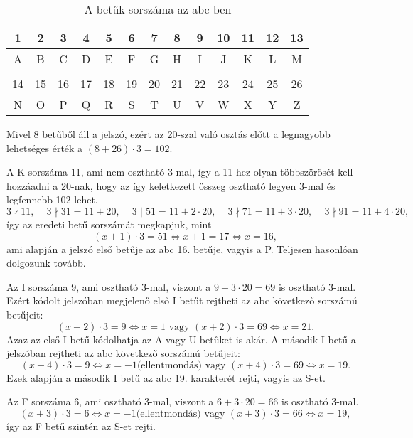 \begin{solution}
\begin{table}[ht]
\centering %
\begin{tabular}{c|c|c|c|c|c|c|c|c|c|c|c|c}
1 & 2 & 3 & 4 & 5 & 6 & 7 & 8 & 9 & 10 & 11 & 12 & 13\tabularnewline
\hline 
A & B & C & D & E & F & G & H & I & J & K & L & M\tabularnewline
\multicolumn{1}{c}{} & \multicolumn{1}{c}{} & \multicolumn{1}{c}{} & \multicolumn{1}{c}{} & \multicolumn{1}{c}{} & \multicolumn{1}{c}{} & \multicolumn{1}{c}{} & \multicolumn{1}{c}{} & \multicolumn{1}{c}{} & \multicolumn{1}{c}{} & \multicolumn{1}{c}{} & \multicolumn{1}{c}{} & \tabularnewline
14 & 15 & 16 & 17 & 18 & 19 & 20 & 21 & 22 & 23 & 24 & 25 & 26\tabularnewline
\hline 
N & O & P & Q & R & S & T & U & V & W & X & Y & Z\tabularnewline
\end{tabular}\caption{A betűk sorszáma az abc-ben}
\end{table}

Mivel 8 betűből áll a jelszó, ezért az 20-szal való osztás előtt a
legnagyobb lehetséges érték a $(8+26)\cdot3=102$.

A K sorszáma 11, ami nem osztható 3-mal, így a 11-hez olyan többszörösét
kell hozzáadni a 20-nak, hogy az így keletkezett összeg osztható legyen
3-mal és legfennebb 102 lehet. 
\[
3\nmid11,\phantom{xx}3\nmid31=11+20,\phantom{xx}3\phantom{l}|\phantom{l}51=11+2\cdot20,\phantom{xx}3\nmid71=11+3\cdot20,\phantom{xx}3\nmid91=11+4\cdot20,
\]
így az eredeti betű sorszámát megkapjuk, mint 
\[
(x+1)\cdot3=51\Leftrightarrow x+1=17\Leftrightarrow x=16,
\]
ami alapján a jelszó első betűje az abc 16. betűje, vagyis a P. Teljesen
hasonlóan dolgozunk tovább.

Az I sorszáma 9, ami osztható 3-mal, viszont a $9+3\cdot20=69$ is
osztható 3-mal. Ezért kódolt jelszóban megjelenő első I betűt rejtheti
az abc következő sorszámú betűjeit: 
\[
(x+2)\cdot3=9\Leftrightarrow x=1\text{ vagy }(x+2)\cdot3=69\Leftrightarrow x=21.
\]
Azaz az első I betű kódolhatja az A vagy U betűket is akár. A második
I betű a jelszóban rejtheti az abc következő sorszámú betűjeit: 
\[
(x+4)\cdot3=9\Leftrightarrow x=-1\text{(ellentmondás)}\text{ vagy }(x+4)\cdot3=69\Leftrightarrow x=19.
\]
Ezek alapján a második I betű az abc 19. karakterét rejti, vagyis
az S-et.

Az F sorszáma 6, ami osztható 3-mal, viszont a $6+3\cdot20=66$ is
osztható 3-mal. 
\[
(x+3)\cdot3=6\Leftrightarrow x=-1\text{(ellentmondás)}\text{ vagy }(x+3)\cdot3=66\Leftrightarrow x=19,
\]
így az F betű szintén az S-et rejti.


\end{solution}
